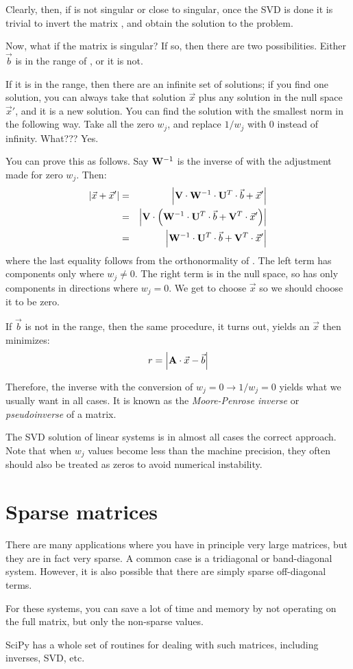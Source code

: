 Clearly, then, if  is not singular or close to singular, once
the SVD is done it is trivial to invert the matrix , and obtain
the solution to the problem.

Now, what if the matrix  is singular? If so, then there are two
possibilities. Either $\vec{b}$ is in the range of , or it is
not.

If it is in the range, then there are an infinite set of solutions; if
you find one solution, you can always take that solution $\vec{x}$
plus any solution in the null space $\vec{x}'$, and it is a new
solution.  You can find the solution with the smallest norm in the
following way. Take all the zero $w_j$, and replace $1/w_j$ with 0
instead of infinity. What??? Yes.

You can prove this as follows. Say ${\bf W}^{-1}$ is the inverse
of  with the adjustment made for zero $w_j$. Then:
\begin{eqnarray}
|\vec{x} + \vec{x}'|
&=& \left| {\bf V}\cdot{\bf W}^{-1} \cdot {\bf U}^T\cdot \vec{b}
+ \vec{x}'\right| \cr
&=& \left| {\bf V}\cdot \left({\bf W}^{-1} \cdot {\bf U}^T\cdot \vec{b}
+ {\bf V}^T \cdot \vec{x}' \right)\right| \cr
&=& \left| {\bf W}^{-1} \cdot {\bf U}^T\cdot \vec{b}
+ {\bf V}^T\cdot \vec{x}'\right| 
\end{eqnarray}
where the last equality follows from the orthonormality of .
The left term has components only where $w_j\ne 0$. The right term is
in the null space, so has only components in directions where $w_j=0$.
We get to choose $\vec{x}$ so we should choose it to be zero.

If $\vec{b}$ is not in the range, then the same procedure, it turns
out, yields an $\vec{x}$ then minimizes:
\begin{equation}
r = \left|{\bf A}\cdot\vec{x} - \vec{b}\right|
\end{equation}

Therefore, the inverse with the conversion of $w_j = 0\rightarrow
1/w_j = 0$ yields what we usually want in all cases. It is known as
the {\it Moore-Penrose inverse} or {\it pseudoinverse} of a matrix. 

The SVD solution of linear systems is in almost all cases the correct
approach. Note that when $w_j$ values become less than the machine
precision, they often should also be treated as zeros to avoid
numerical instability.

\section{Sparse matrices}

There are many applications where you have in principle very large
matrices, but they are in fact very sparse. A common case is a
tridiagonal or band-diagonal system. However, it is also possible that
there are simply sparse off-diagonal terms. 

For these systems, you can save a lot of time and memory by not
operating on the full matrix, but only the non-sparse values.

SciPy has a whole set of routines for dealing with such matrices,
including inverses, SVD, etc. 

